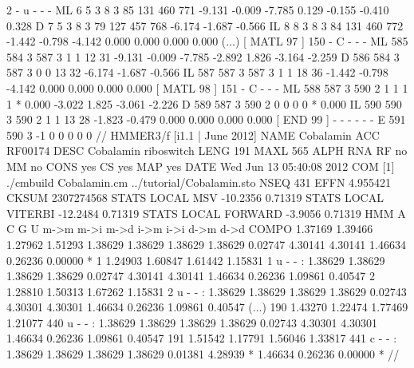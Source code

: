 \begin{tinysreoutput}
                                             [ MATL    2 ]      2      - u - - -
    ML     6     5 3     8     3    85   131   460   771  -9.131  -0.009  -7.785                          0.129 -0.155 -0.410  0.328 
     D     7     5 3     8     3    79   127   457   768  -6.174  -1.687  -0.566                         
    IL     8     8 3     8     3    84   131   460   772  -1.442  -0.798  -4.142                          0.000  0.000  0.000  0.000 
(...)
                                             [ MATL   97 ]    150      - C - - -
    ML   585   584 3   587     3     1     1    12    31  -9.131  -0.009  -7.785                         -2.892  1.826 -3.164 -2.259 
     D   586   584 3   587     3     0     0    13    32  -6.174  -1.687  -0.566                         
    IL   587   587 3   587     3     1     1    18    36  -1.442  -0.798  -4.142                          0.000  0.000  0.000  0.000 
                                             [ MATL   98 ]    151      - C - - -
    ML   588   587 3   590     2     1     1     1     1       *   0.000                                 -3.022  1.825 -3.061 -2.226 
     D   589   587 3   590     2     0     0     0     0       *   0.000                                 
    IL   590   590 3   590     2     1     1    13    28  -1.823  -0.479                                  0.000  0.000  0.000  0.000 
                                             [ END    99 ]      -      - - - - -
     E   591   590 3    -1     0     0     0     0     0                                                 
//
HMMER3/f [i1.1 | June 2012]
NAME  Cobalamin
ACC   RF00174
DESC  Cobalamin riboswitch
LENG  191
MAXL  565
ALPH  RNA
RF    no
MM    no
CONS  yes
CS    yes
MAP   yes
DATE  Wed Jun 13 05:40:08 2012
COM   [1] ./cmbuild Cobalamin.cm ../tutorial/Cobalamin.sto
NSEQ  431
EFFN  4.955421
CKSUM 2307274568
STATS LOCAL MSV      -10.2356  0.71319
STATS LOCAL VITERBI  -12.2484  0.71319
STATS LOCAL FORWARD   -3.9056  0.71319
HMM          A        C        G        U   
            m->m     m->i     m->d     i->m     i->i     d->m     d->d
  COMPO   1.37169  1.39466  1.27962  1.51293
          1.38629  1.38629  1.38629  1.38629
          0.02747  4.30141  4.30141  1.46634  0.26236  0.00000        *
      1   1.24903  1.60847  1.61442  1.15831      1 u - - :
          1.38629  1.38629  1.38629  1.38629
          0.02747  4.30141  4.30141  1.46634  0.26236  1.09861  0.40547
      2   1.28810  1.50313  1.67262  1.15831      2 u - - :
          1.38629  1.38629  1.38629  1.38629
          0.02743  4.30301  4.30301  1.46634  0.26236  1.09861  0.40547
(...)
    190   1.43270  1.22474  1.77469  1.21077    440 u - - :
          1.38629  1.38629  1.38629  1.38629
          0.02743  4.30301  4.30301  1.46634  0.26236  1.09861  0.40547
    191   1.51542  1.17791  1.56046  1.33817    441 c - - :
          1.38629  1.38629  1.38629  1.38629
          0.01381  4.28939        *  1.46634  0.26236  0.00000        *
//
\end{tinysreoutput}


